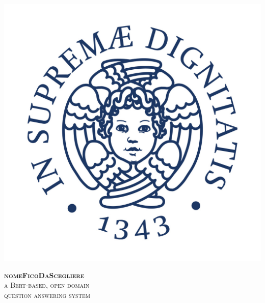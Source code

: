 \documentclass[12pt,a4paper,hidelinks]{article}
\newcommand{\nomefico}{\textbf{nomeFicoDaScegliere}}
\begin{document}
\begin{titlepage}
    \centering
    \begin{minipage}{0.22\textwidth}%
        \includegraphics[width=\linewidth]{pics/Cherubino.jpg}
    \end{minipage}\hspace{10pt}
    \begin{minipage}{0.6\textwidth}%
        \flushright
        \large
        \vspace{0.8cm}
        \textsc{\color{pblue}%
        \nomefico\\
        a Bert-based, open domain\\
        question answering system}
    \end{minipage}%

    
    
    
    
    \vspace{0.3cm}
    

\end{titlepage}
\end{document}
